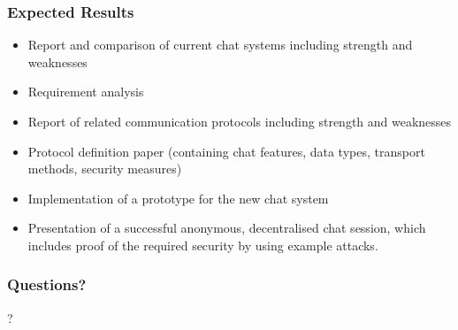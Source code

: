 \documentclass{beamer}
\begin{document}
\frame
{
  \frametitle{Expected Results}
  \begin{itemize}
    \item Report and comparison of current chat systems including strength and weaknesses
    \item Requirement analysis
    \item Report of related communication protocols including strength and weaknesses
    \item Protocol definition paper (containing chat features,
        data types, transport methods, security measures)
    \item Implementation of a prototype for the new chat system
    \item Presentation of a successful anonymous, decentralised chat session, which
       includes proof of the required security by using example attacks.
  \end{itemize}
}


\frame
{
  \frametitle{Questions?}
  \begin{center}
  ?
  \end{center}
}



%
%


\end{document}
